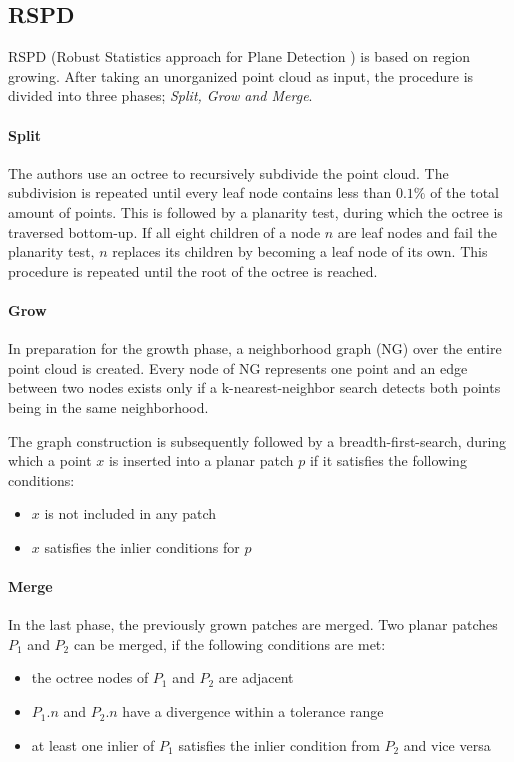 \documentclass[main.tex]{subfiles}
\begin{document}
\subsection{RSPD}
RSPD (Robust Statistics approach for Plane Detection \cite{Araújo_Oliveira_2020}) is based on region growing. After taking an unorganized point cloud as input, the procedure is divided into three phases; 
\textit{Split, Grow and Merge}.

\paragraph*{Split}
The authors use an octree to recursively subdivide the point cloud. The subdivision is repeated until every leaf node contains less than $0.1\%$ of the total amount
of points.
This is followed by a planarity test, during which the octree is traversed bottom-up. If all eight children of a node $n$ are leaf nodes and fail the planarity test, $n$ replaces its children
by becoming a leaf node of its own. This procedure is repeated until the root of the octree is reached.
 
\paragraph*{Grow}
In preparation for the growth phase, a neighborhood graph (NG) over the entire point cloud is created. Every node of NG represents one point and an edge between two nodes exists only if
a k-nearest-neighbor search detects both points being in the same neighborhood. 

The graph construction is subsequently followed by a breadth-first-search, during which a point $x$ is inserted into a planar patch $p$ if it satisfies the following conditions:
\begin{itemize}
    \item $x$ is not included in any patch
    \item $x$ satisfies the inlier conditions for $p$ %
\end{itemize}

\paragraph*{Merge}
In the last phase, the previously grown patches are merged. Two planar patches $P_1$ and $P_2$ can be merged, if the following conditions are met: 
\begin{itemize}
    \item the octree nodes of $P_1$ and $P_2$ are adjacent
    \item $P_1.n$ and $P_2.n$ have a divergence within a tolerance range
    \item at least one inlier of $P_1$ satisfies the inlier condition from $P_2$ and vice versa
\end{itemize}
\end{document}
